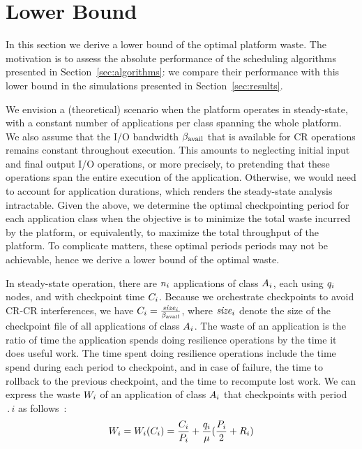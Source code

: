 
\section{Lower Bound}
\label{sec:lowerbound}

In this section we derive a lower bound of the optimal platform waste. The motivation is to assess the absolute performance of the scheduling algorithms presented in Section~\ref{sec:algorithms}: 
we compare their performance with  this lower bound in the simulations presented in Section~\ref{sec:results}.

We envision a (theoretical) scenario when the platform operates in steady-state,
with a constant number of applications per class spanning the whole platform. We also assume that
the I/O bandwidth $\beta_{\text{avail}}$  that is available for CR operations remains constant throughout
execution. This amounts to neglecting initial input and final output I/O operations,
or more precisely, to pretending that these operations span the entire execution of the application.
Otherwise, we would need to account for application durations, which renders the
steady-state analysis intractable. 
Given the above, we determine the optimal checkpointing period for each application class
when the objective is to minimize the total waste incurred  by the platform, or equivalently,
to maximize the total throughput of the platform. To complicate matters, these optimal periods
periods may not be achievable,  hence we derive a lower bound of the optimal waste. 

In steady-state operation, there are $n_{i}$ applications of class $A_{i}$,
each using $q_{i}$ nodes, and with checkpoint time $C_{i}$. Because we orchestrate
checkpoints to avoid CR-CR interferences, we have $C_{i} = \frac{\mathit{size}_{i}}{\beta_{\text{avail}}}$,
where $\mathit{size}_{i}$ denote the size of the checkpoint file of all applications of class $A_{i}$.
The waste of an application is the ratio of time the application spends doing
resilience operations by the time it does useful work. The time spent doing
resilience operations include the time spend during each period to checkpoint,
and in case of failure, the time to rollback to the previous checkpoint, and the
time to recompute lost work.
We
can express the waste $W_{i}$ of an application of class
$A_{i}$ that checkpoints with period $\period{i}$
as follows~\cite{springer-monograph}:
\begin{equation}
W_{i} = W_{i}(C_{i}) = \frac{C_{i}}{P_{i}} +
\frac{q_{i}}{\mu}(\frac{P_{i}}{2} + R_{i})
\label{eq.wasteAi}
\end{equation}

